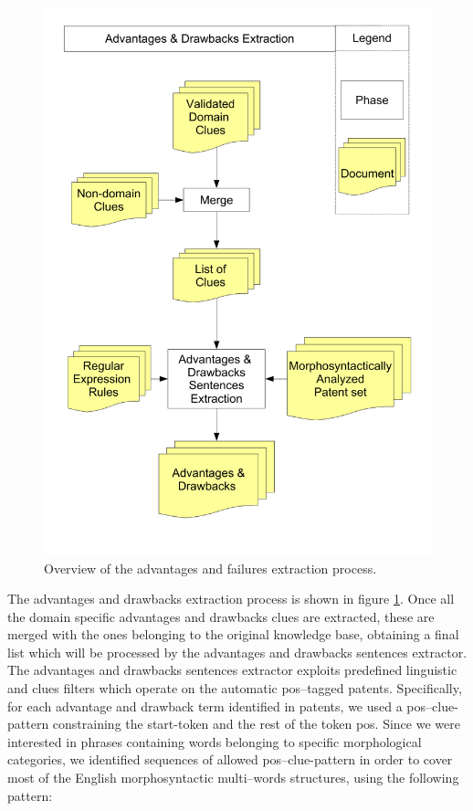 \documentclass[]{book}
\begin{document}
\begin{figure}

{\centering \includegraphics[width=0.8\linewidth]{_bookdown_files/figures/relevant-sentences-extraction} 

}

\caption{Overview of the advantages and failures extraction process.}\label{fig:advantagedrawbacksextraction}
\end{figure}

The advantages and drawbacks extraction process is shown in figure
\ref{fig:advantagedrawbacksextraction}. Once all the domain specific
advantages and drawbacks clues are extracted, these are merged with the
ones belonging to the original knowledge base, obtaining a final list
which will be processed by the advantages and drawbacks sentences
extractor. The advantages and drawbacks sentences extractor exploits
predefined linguistic and clues filters which operate on the automatic
pos--tagged patents. Specifically, for each advantage and drawback term
identified in patents, we used a pos--clue-pattern constraining the
start-token and the rest of the token pos. Since we were interested in
phrases containing words belonging to specific morphological categories,
we identified sequences of allowed pos--clue-pattern in order to cover
most of the English morphosyntactic multi--words structures, using the
following pattern:
\end{document}
